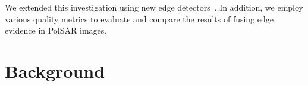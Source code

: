 \documentclass{article}
\begin{document}
We extended this investigation using new edge detectors~\cite{Shi2020,Xiang2016}. 
In addition, we employ various quality metrics to evaluate and compare the results of fusing edge evidence in PolSAR images.
\vspace{-0.2cm}
\section{Background}
\vspace{-0.3cm}
\end{document}
